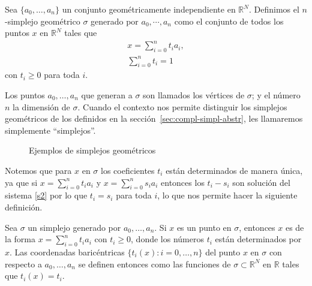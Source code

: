 \begin{Defi}
Sea $\{a_0,\ldots,a_n\}$ un conjunto geo\-métricamente independiente en  $\mathbb{R}^{N}$. Definimos el $n$-simplejo geométrico $\sigma$ generado por $a_0,\cdots,a_n$ como el conjunto de todos los puntos $x$ en $\mathbb{R}^{N}$ tales que 
\begin{equation}\label{s2}
\begin{split}
x = \sum_{i=0}^{n}t_ia_i,\\
\sum_{i=0}^{n}t_i=1
\end{split}
\end{equation}
con $t_i\geq 0$ para toda $i$.

Los puntos $a_0,\ldots,a_n$ que generan a $\sigma$ son llamados los
vértices de $\sigma$; y el número $n$ la dimensión de $\sigma$. Cuando
el contexto nos permite distinguir los simplejos geométricos de los
definidos en la sección~\ref{sec:compl-simpl-abstr}, les llamaremos
simplemente ``simplejos''.
\end{Defi}

\begin{figure}[h]
\centering
{}
\caption{Ejemplos de simplejos geométricos}
\end{figure}

Notemos que para $x$ en $\sigma$ los coeficientes $t_i$ están determinados de manera única, ya que si $x = \sum_{i=0}^{n}t_ia_i$ y $x = \sum_{i=0}^{n}s_ia_i$ entonces los $t_i-s_i$ son solución del sistema \ref{s2} por lo que $t_i=s_i$ para toda $i$, lo que nos permite hacer la 
siguiente definición.
\begin{Defi}
Sea $\sigma$ un simplejo generado por $a_0,\ldots,a_n$. Si $x$ es un
punto en $\sigma$, entonces $x$ es de la forma $x =
\sum_{i=0}^{n}t_ia_i$ con $t_i\geq 0$, donde los números $t_i$ están
determinados por $x$. Las coordenadas baricéntricas $\{t_i(x):i =
0,\ldots,n\}$ del punto $x$ en $\sigma$ con respecto a $a_0,\ldots,a_n$ se
definen entonces como las funciones de $\sigma\subset\mathbb{R}^N$ en $\mathbb{R}$ tales que $t_i(x) = t_i$.
\end{Defi}

